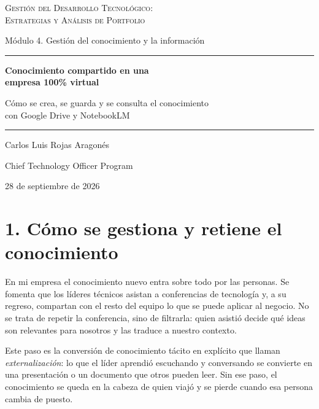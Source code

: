 \documentclass[11pt,letterpaper]{article}
\begin{document}
\begin{titlepage}
\centering
\vspace*{3.2cm}
{\large\scshape Gestión del Desarrollo Tecnológico:\\
Estrategias y Análisis de Portfolio\par}
\vspace{0.5cm}
{\normalsize Módulo 4. Gestión del conocimiento y la información\par}
\vspace{2.6cm}
{\color{cTec}\rule{0.55\textwidth}{0.8pt}\par}
\vspace{0.7cm}
{\LARGE\bfseries Conocimiento compartido en una\\[0.2em]
empresa 100\% virtual\par}
\vspace{0.5cm}
{\large Cómo se crea, se guarda y se consulta el conocimiento\\
con Google Drive y NotebookLM\par}
\vspace{0.7cm}
{\color{cTec}\rule{0.55\textwidth}{0.8pt}\par}
\vfill
{\large Carlos Luis Rojas Aragonés\par}
\vspace{0.3cm}
{\normalsize Chief Technology Officer Program\par}
\vspace{0.3cm}
{\normalsize 28 de septiembre de 2026\par}
\vspace*{1.5cm}
\end{titlepage}

\section*{1. Cómo se gestiona y retiene el conocimiento}

En mi empresa el conocimiento nuevo entra sobre todo por las personas. Se
fomenta que los líderes técnicos asistan a conferencias de tecnología y, a su
regreso, compartan con el resto del equipo lo que se puede aplicar al negocio.
No se trata de repetir la conferencia, sino de filtrarla: quien asistió decide
qué ideas son relevantes para nosotros y las traduce a nuestro contexto.

Este paso es la conversión de conocimiento tácito en explícito que
\textcite{nonaka1995} llaman \emph{externalización}: lo que el líder aprendió
escuchando y conversando se convierte en una presentación o un documento que
otros pueden leer. Sin ese paso, el conocimiento se queda en la cabeza de
quien viajó y se pierde cuando esa persona cambia de puesto.
\end{document}
